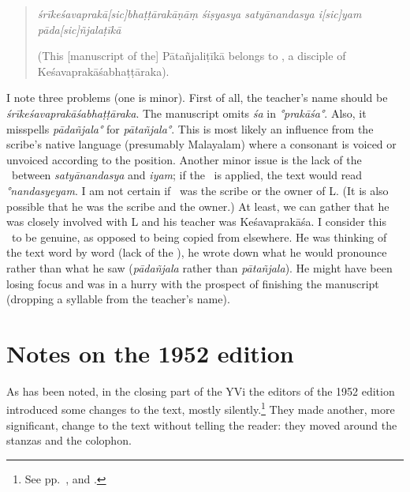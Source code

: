 \begin{quote}
\emph{śrīkeśavaprakā\emph{[sic]}bhaṭṭārakāṇāṃ śiṣyasya satyānandasya i\emph{[sic]}yam pāda\emph{[sic]}\-ñja\-la\-ṭīkā} 

(This [manuscript of the] Pātañjaliṭīkā belongs to \Satyananda, a disciple of Keśavaprakāśabhaṭṭāraka).
\end{quote}
I note three problems (one is minor). First of all, the teacher's name should be \emph{śrīkeśavaprakāśa\-bhaṭṭāraka}. The manuscript omits \emph{śa} in \emph{°prakāśa°}. Also, it misspells \emph{pādañjala°} for \emph{pātañjala°}. This is most likely an influence from the scribe's native language (presumably Malayalam) where a consonant is voiced or unvoiced according to the position. Another minor issue is the lack of the \sandhi\ between \emph{satyānandasya} and \emph{iyam}; if the \sandhi\ is applied, the text would read \emph{°nandasyeyam}. I am not certain if \Satyananda\ was the scribe or the owner of L\@. (It is also possible that he was the scribe and the owner.) At least, we can gather that he was closely involved with L and his teacher was Keśavaprakāśa. I consider this \colophon\ to be genuine, as opposed to being copied from elsewhere. He was thinking of the text word by word (lack of the \sandhi), he wrote down what he would pronounce rather than what he saw (\emph{pādañjala} rather than \emph{pātañjala}). He might have been losing focus and was in a hurry with the prospect of finishing the manuscript (dropping a syllable from the teacher's name).

\section{Notes on the 1952 edition}
As has been noted, in the closing part of the YVi the editors of the 1952 edition introduced some changes to the text, mostly silently.\footnote{See pp.~\pageref{EDITALT0}, \pageref{EDITALT1} and \pageref{EDITALT2}.} 
They made another, more significant, change to the text without telling the reader: they moved around the stanzas and the colophon.

